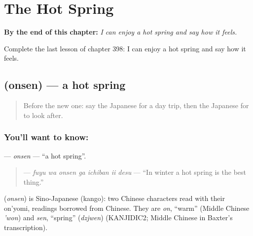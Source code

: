 
\chapter{The Hot Spring}
\label{ch:ja-the-hot-spring}

\begin{chapteropening}
\textbf{By the end of this chapter:} \emph{I can enjoy a hot spring and say how it feels.}

Complete the last lesson of chapter 398: I can enjoy a hot spring and say how it feels.
\end{chapteropening}

\section[\texorpdfstring{\ja{おんせん} (onsen)}{おんせん (onsen)}]{ (onsen) — a hot spring}

\label{lesson:JA-C398-onsen}



\begin{quote}
Before the new one: say the Japanese for a day trip, then the Japanese for to look after.
\end{quote}

\subsection*{You'll want to know: }
\textbf{} — \emph{onsen} — \textquotedblleft{}a hot spring\textquotedblright{}.

\begin{quote}
\textbf{   } — \emph{fuyu wa onsen ga ichiban ii desu} — \textquotedblleft{}In winter a hot spring is the best thing.\textquotedblright{}
\end{quote}

\begin{cousinweb}
\textbf{} (\emph{onsen}) is Sino-Japanese (kango): two Chinese characters read with their on'yomi, readings borrowed from Chinese. They are \emph{on}, \textquotedblleft{}warm\textquotedblright{} (Middle Chinese \emph{'won}) and \emph{sen}, \textquotedblleft{}spring\textquotedblright{} (\emph{dzjwen}) (KANJIDIC2; Middle Chinese in Baxter's transcription).
\end{cousinweb}

